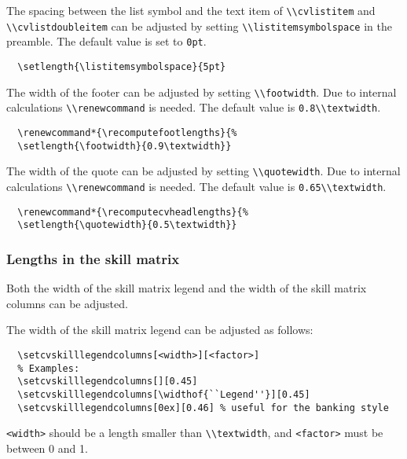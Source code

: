 \documentclass[a4paper, 11pt]{article}
\newcommand{\code}[1]{\lstinline!#1!}
\begin{document}
The spacing between the list symbol and the text item of \code{\\cvlistitem} and \code{\\cvlistdoubleitem} can be adjusted by setting \code{\\listitemsymbolspace} in the preamble. The default value is set to \code{0pt}.
\begin{lstlisting}
  \setlength{\listitemsymbolspace}{5pt}
\end{lstlisting}

The width of the footer can be adjusted by setting \code{\\footwidth}. Due to internal calculations \code{\\renewcommand} is needed. The default value is \code{0.8\\textwidth}.
\begin{lstlisting}
  \renewcommand*{\recomputefootlengths}{%
  \setlength{\footwidth}{0.9\textwidth}}
\end{lstlisting}

The width of the quote can be adjusted by setting \code{\\quotewidth}. Due to internal calculations \code{\\renewcommand} is needed. The default value is \code{0.65\\textwidth}.
\begin{lstlisting}
  \renewcommand*{\recomputecvheadlengths}{%
  \setlength{\quotewidth}{0.5\textwidth}}
\end{lstlisting}




\subsubsection{Lengths in the skill matrix}
\label{section:length:skillmatrix}
Both the width of the skill matrix legend and the width of the skill matrix columns can be adjusted.

The width of the skill matrix legend can be adjusted as follows:
\begin{lstlisting}
  \setcvskilllegendcolumns[<width>][<factor>]
  % Examples:
  \setcvskilllegendcolumns[][0.45]
  \setcvskilllegendcolumns[\widthof{``Legend''}][0.45]
  \setcvskilllegendcolumns[0ex][0.46] % useful for the banking style
\end{lstlisting}
\code{<width>} should be a length smaller than \code{\\textwidth}, and \code{<factor>} must be between 0 and 1.
\end{document}
